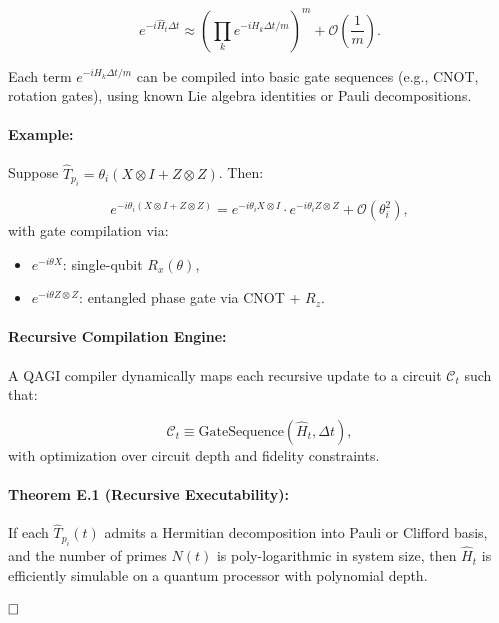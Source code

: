 \[
e^{-i \hat{H}_t \Delta t} \approx \left( \prod_k e^{-i H_k \Delta t / m} \right)^m + \mathcal{O}\left(\frac{1}{m}\right).
\]

Each term \(e^{-i H_k \Delta t / m}\) can be compiled into basic gate sequences (e.g., CNOT, rotation gates), using known Lie algebra identities or Pauli decompositions.

\paragraph{Example:}
Suppose \(\hat{T}_{p_i} = \theta_i (X \otimes I + Z \otimes Z)\). Then:

\[
e^{-i \theta_i (X \otimes I + Z \otimes Z)} = e^{-i \theta_i X \otimes I} \cdot e^{-i \theta_i Z \otimes Z} + \mathcal{O}(\theta_i^2),
\]
with gate compilation via:

\begin{itemize}
    \item \(e^{-i \theta X}\): single-qubit \(R_x(\theta)\),
    \item \(e^{-i \theta Z \otimes Z}\): entangled phase gate via CNOT + \(R_z\).
\end{itemize}

\paragraph{Recursive Compilation Engine:}
A QAGI compiler dynamically maps each recursive update to a circuit \(\mathcal{C}_t\) such that:

\[
\mathcal{C}_t \equiv \text{GateSequence}(\hat{H}_t, \Delta t),
\]
with optimization over circuit depth and fidelity constraints.

\paragraph{Theorem E.1 (Recursive Executability):}
If each \(\hat{T}_{p_i}(t)\) admits a Hermitian decomposition into Pauli or Clifford basis, and the number of primes \(N(t)\) is poly-logarithmic in system size, then \(\hat{H}_t\) is efficiently simulable on a quantum processor with polynomial depth.

\(\hfill \square\)

